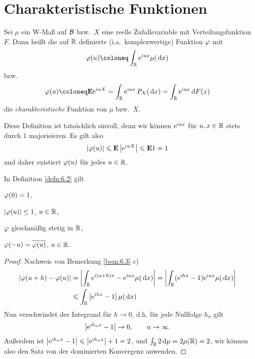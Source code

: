 \section{Charakteristische Funktionen}


\begin{defn}
\label{defn:6.2}
Sei $\mu$ ein W-Maß auf ${\mathcal{B}}$ bzw.\ $X$ eine
reelle Zufallsvariable mit Verteilungsfunktion $F$. Dann heißt die auf
$\mathbb{R}$ definierte (i.a.\ komplexwertige) Funktion $\varphi$
mit
\begin{align*}
\ph (u) \defl \int_{\R} \e^{iux} \mu(\dx)
\end{align*}
bzw.
\begin{align*}
\ph(u) \defl \E \e^ {iuX} = \int_{\R }\e^ {iux}\,P_{X}(\dx) =
\int _{\R}\e^ {iux} \dF(x)
\end{align*}
die \emph{charakteristische} Funktion von $\mu$ bzw.\ $X$.\fishhere
\end{defn}

Diese Definition ist tatsächlich sinvoll, denn wir können $\mathrm{e}^{iux}$ für
$u,x\in\mathbb{R}$ stets durch $1$ majorisieren. Es gilt also
\begin{align*}
\left|\varphi(u)\right|\leqslant \textbf{E}\left|\mathrm{e}^{iu X}\right| \leqslant \textbf{E} 1 =1
\end{align*}
und daher existiert $\varphi(u)$ für jedes $u\in\mathbb{R}$.

\begin{bem}[Bemerkungen.]
\label{bem:6.3}
In Definition \ref{defn:6.2} gilt\\[-7mm]
\begin{bemenum}
\item $\varphi (0) = 1$,
\item $\left|\varphi (u)\right| \leq 1$, $ u\in \mathbb{R}$,
\item $\varphi $ gleichmäßig stetig in $\mathbb{R}$,
\item $\varphi (-u) = \overline{\varphi (u)}$, $ u \in \mathbb{R}$.\maphere
\end{bemenum}
\end{bem}
\begin{proof}
Nachweis von Bemerkung \ref{bem:6.3} c)
\begin{align*}
\left|\varphi(u+h)-\varphi(u)\right|
&= \left|\int_{\mathbb{R}} \mathrm{e}^{i(u+h)x}-\mathrm{e}^{iux}\mu(\,\mathrm{d} x)\right|
= \left|\int_{\mathbb{R}} (\mathrm{e}^{ihx}-1)\mathrm{e}^{iux}\mu(\,\mathrm{d} x)\right|\\
&\leqslant \int_{\mathbb{R}}\left|\mathrm{e}^{ihx}-1\right|\mu(\,\mathrm{d} x)
\end{align*}
Nun verschwindet der Integrand für $h\to 0$, d.h. für jede Nullfolge $h_n$ gilt
\begin{align*}
\left|\mathrm{e}^{ih_nx}-1\right|\to 0,\qquad n\to\infty.
\end{align*}
Außerdem ist $\left|\mathrm{e}^{ih_nx}-1\right|\leqslant \left|\mathrm{e}^{ih_nx}\right|+1 = 2$, und $\int_{\mathbb{R}} 2\,\mathrm{d} \mu =
2\mu(\mathbb{R}) = 2$, wir können also den Satz von der dominierten Konvergenz
anwenden.\qedhere
\end{proof}


